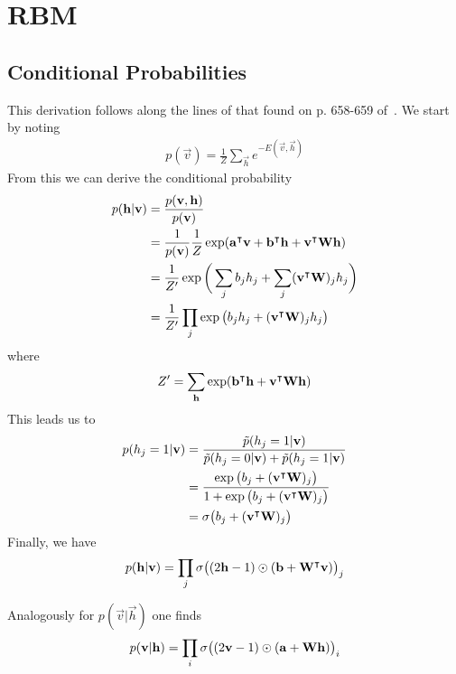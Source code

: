 \section{RBM}
\subsection{Conditional Probabilities}\label{app:conditional_probabilities_derivation}
This derivation follows along the lines of that found on p. 658-659 of~\cite{goodfellow_deep_learning}.
We start by noting
\begin{align}
    p(\vec{v}) = \frac{1}{Z} \sum_\vec{h} e^{-E(\vec{v},\vec{h})}
\end{align}
From this we can derive the conditional probability
\begin{align}
    p(\mathbf{h} | \mathbf{v})
        &= \frac{p(\mathbf{v},\mathbf{h})}{p(\mathbf{v})} \\
        &= \frac{1}{p(\mathbf{v})} \frac{1}{Z} \exp( \mathbf{a}^\intercal\mathbf{v} + \mathbf{b}^\intercal\mathbf{h} + \mathbf{v}^\intercal\mathbf{W}\mathbf{h} ) \\
        &= \frac{1}{Z'} \exp\bigg( \sum_j b_j h_j + \sum_j (\mathbf{v}^\intercal\mathbf{W})_j h_j \bigg) \\
        &= \frac{1}{Z'} \prod_j \exp\big( b_j h_j + (\mathbf{v}^\intercal\mathbf{W})_j h_j \big)
\end{align}
where
\begin{align}
    Z' = \sum_{\mathbf{h}} \exp( \mathbf{b}^\intercal\mathbf{h} + \mathbf{v}^\intercal\mathbf{W}\mathbf{h} )
\end{align}
This leads us to
\begin{align}
    p(h_j = 1 | \mathbf{v})
        &= \frac{\tilde{p}(h_j = 1 | \mathbf{v})}{\tilde{p}(h_j = 0 | \mathbf{v}) + \tilde{p}(h_j = 1 | \mathbf{v})} \\
        &= \frac{\exp\big( b_j + (\mathbf{v}^\intercal\mathbf{W})_j \big)}{1 + \exp\big( b_j + (\mathbf{v}^\intercal\mathbf{W})_j \big)} \\
        &= \sigma\big( b_j + (\mathbf{v}^\intercal\mathbf{W})_j \big)
\end{align}
Finally, we have
\begin{align}
    p(\mathbf{h} | \mathbf{v}) = \prod_j \sigma\big( (2\mathbf{h} - 1) \odot (\mathbf{b} + \mathbf{W}^\intercal\mathbf{v}) \big)_j
\end{align}

Analogously for \( p(\vec{v} | \vec{h}) \) one finds
\begin{align}
    p(\mathbf{v} | \mathbf{h}) = \prod_i \sigma\big( (2\mathbf{v} - 1) \odot (\mathbf{a} + \mathbf{W}\mathbf{h}) \big)_i
\end{align}

